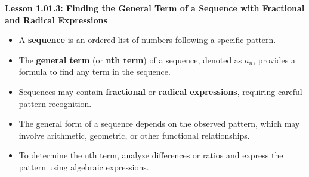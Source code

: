 \begin{center}
\textbf{Lesson 1.01.3: Finding the General Term of a Sequence with Fractional and Radical Expressions}
\end{center}

\vspace*{-1.5ex}

\begin{itemize}
    \item A \textbf{sequence} is an ordered list of numbers following a specific pattern.
    \item The \textbf{general term} (or \textbf{nth term}) of a sequence, denoted as $a_n$, provides a formula to find any term in the sequence.
    \item Sequences may contain \textbf{fractional} or \textbf{radical expressions}, requiring careful pattern recognition.
    \item The general form of a sequence depends on the observed pattern, which may involve arithmetic, geometric, or other functional relationships.
    \item To determine the nth term, analyze differences or ratios and express the pattern using algebraic expressions.
\end{itemize}